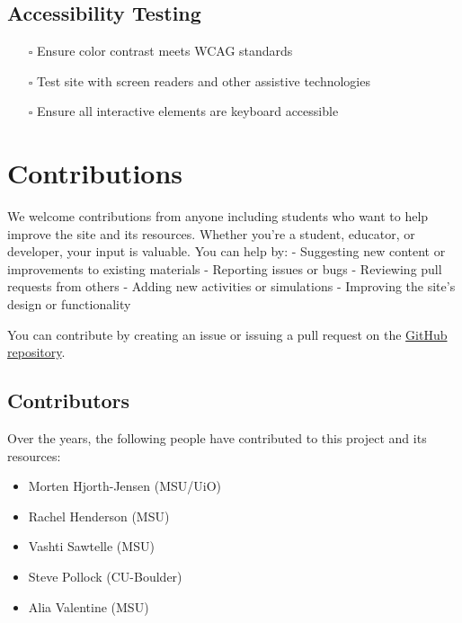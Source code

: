 \subsection{Accessibility Testing}\label{accessibility-testing}

\begin{itemize}
\tightlist
\item[$\square$]
  Ensure color contrast meets WCAG standards
\item[$\square$]
  Test site with screen readers and other assistive technologies
\item[$\square$]
  Ensure all interactive elements are keyboard accessible
\end{itemize}

\section{Contributions}\label{contributions}

We welcome contributions from anyone including students who want to help
improve the site and its resources. Whether you're a student, educator,
or developer, your input is valuable. You can help by: - Suggesting new
content or improvements to existing materials - Reporting issues or bugs
- Reviewing pull requests from others - Adding new activities or
simulations - Improving the site's design or functionality

You can contribute by creating an issue or issuing a pull request on the
\href{https://github.com/dannycab/modern-classical-mechanics}{GitHub
repository}.

\subsection{Contributors}\label{contributors}

Over the years, the following people have contributed to this project
and its resources:

\begin{itemize}
\tightlist
\item
  Morten Hjorth-Jensen (MSU/UiO)
\item
  Rachel Henderson (MSU)
\item
  Vashti Sawtelle (MSU)
\item
  Steve Pollock (CU-Boulder)
\item
  Alia Valentine (MSU)
\end{itemize}
